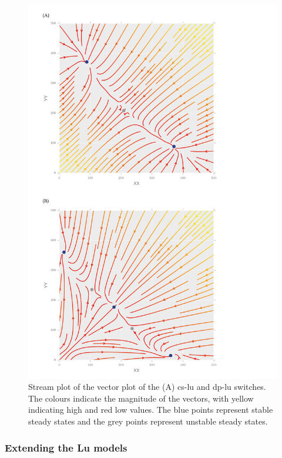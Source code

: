 \begin{figure}[htbp]
\begin{center}
	\includegraphics[scale=0.5]{../../chapters/chapterStabilityFinder/images/lu_bifurc.png}
	\caption[Phase plane analysis of the Lu toggle switch models]{\label{fig:lu_bifurc}  Stream plot of the vector plot of the (A) \acrshort{cs-lu} and \acrshort{dp-lu} switches. The colours indicate the magnitude of the vectors, with yellow indicating high and red low values. The blue points represent stable steady states and the grey points represent unstable steady states.  }
\end{center}
\end{figure}
\clearpage
 
\subsubsection{Extending the Lu models}

